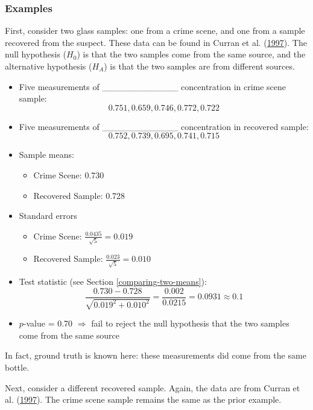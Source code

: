\documentclass[]{book}
\providecommand{\tightlist}{%
  \setlength{\itemsep}{0pt}\setlength{\parskip}{0pt}}
\theoremstyle{definition}
\theoremstyle{definition}
\theoremstyle{remark}
\begin{document}
\subsubsection{Examples}\label{examples-4}

First, consider two glass samples: one from a crime scene, and one from
a sample recovered from the suspect. These data can be found in Curran
et al. (\protect\hyperlink{ref-curranetal}{1997}). The null hypothesis
(\(H_0\)) is that the two samples come from the same source, and the
alternative hypothesis (\(H_A\)) is that the two samples are from
different sources.

\begin{itemize}
\item
  Five measurements of \_\_\_\_\_\_\_\_\_\_\_\_ concentration in crime
  scene sample: \[0.751, 0.659, 0.746, 0.772, 0.722\]
\item
  Five measurements of \_\_\_\_\_\_\_\_\_\_\_\_ concentration in
  recovered sample: \[0.752, 0.739, 0.695, 0.741, 0.715\]
\item
  Sample means:

  \begin{itemize}
  \tightlist
  \item
    Crime Scene: 0.730
  \item
    Recovered Sample: 0.728
  \end{itemize}
\item
  Standard errors

  \begin{itemize}
  \tightlist
  \item
    Crime Scene: \(\frac{0.0435}{\sqrt{5}}=0.019\)
  \item
    Recovered Sample: \(\frac{0.023}{\sqrt{5}}=0.010\)
  \end{itemize}
\item
  Test statistic (see Section \ref{comparing-two-means}):
  \[\frac{0.730 - 0.728}{\sqrt{0.019^2 + 0.010^2}} = \frac{0.002}{0.0215} = 0.0931 \approx 0.1\]
\item
  \(p\)-value = 0.70 \(\Rightarrow\) fail to reject the null hypothesis
  that the two samples come from the same source
\end{itemize}

In fact, ground truth is known here: these measurements did come from
the same bottle.

Next, consider a different recovered sample. Again, the data are from
Curran et al. (\protect\hyperlink{ref-curranetal}{1997}). The crime
scene sample remains the same as the prior example.
\end{document}
